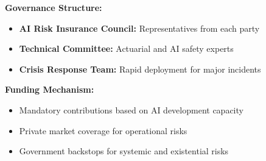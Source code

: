 \documentclass[11pt]{article}
\begin{document}
\textbf{Governance Structure:}
\begin{itemize}
   \item \textbf{AI Risk Insurance Council:} Representatives from each party
   \item \textbf{Technical Committee:} Actuarial and AI safety experts
   \item \textbf{Crisis Response Team:} Rapid deployment for major incidents
\end{itemize}

\textbf{Funding Mechanism:}
\begin{itemize}
   \item Mandatory contributions based on AI development capacity
   \item Private market coverage for operational risks
   \item Government backstops for systemic and existential risks
\end{itemize}
\end{document}
